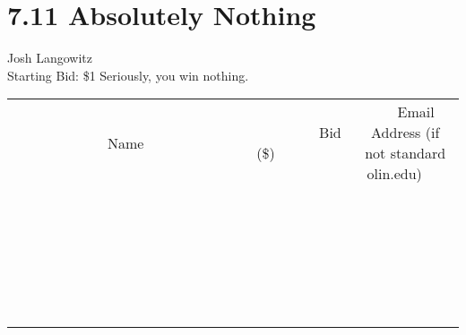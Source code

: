\documentclass[11pt]{article}
\begin{document}
\section*{7.11 Absolutely Nothing}
Josh Langowitz
\\
Starting Bid: \$1
\newline
Seriously, you win nothing.
\\[6ex]
\begin{tabular}{c c c}
~~~~~~~~~~~~~Name~~~~~~~~~~~~~ & ~~~~~~~~~Bid (\$)~~~~~~~~~  & ~~~Email Address (if not standard olin.edu)~~~\\
 & & \\
\hline
 & & \\
\hline
 & & \\
\hline
 & & \\
\hline
 & & \\
\hline
 & & \\
\hline
 & & \\
\hline
 & & \\
\hline
 & & \\
\hline
 & & \\
\hline
 & & \\
\hline
 & & \\
\hline
 & & \\
\hline
 & & \\
\hline
 & & \\
\hline
 & & \\
\hline
 & & \\
\hline
 & & \\
\hline
 & & \\
\hline
 & & \\
\hline
 & & \\
\hline
 & & \\
\hline
 & & \\
\hline
 & & \\
\hline
 & & \\
\hline
 & & \\
\hline
\end{tabular}
\newpage
\end{document}
